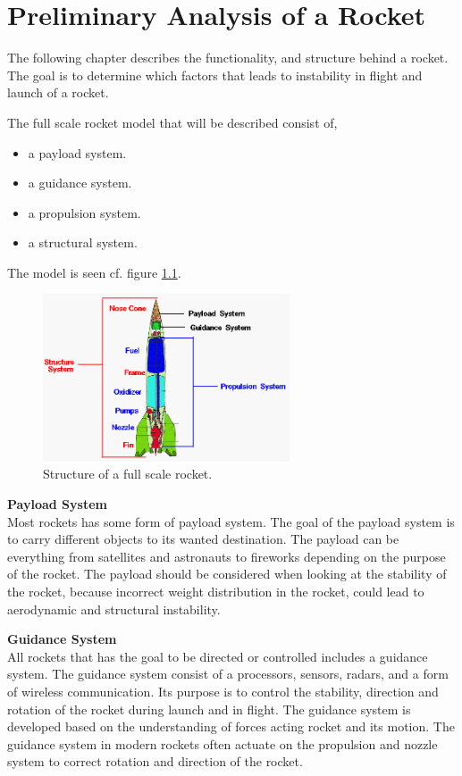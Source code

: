 \chapter{Preliminary Analysis of a Rocket}
The following chapter describes the functionality,  and structure behind a rocket. The goal is to determine which factors that leads to instability in flight and launch of a rocket. 



The full scale rocket model that will be described consist of,
\begin{itemize}[noitemsep]
\item a payload system.
\item a guidance system.
\item a propulsion system. 
\item a structural system.
\end{itemize}    
The model is seen cf. figure \ref{fig:RocketStructure}.
\begin{figure}[htbp]
	\centering
 	\includegraphics[width=0.65\textwidth]{figures/RocketStructure.png} 
 	\caption{Structure of a full scale rocket\cite{web:RocketStructure}.}
 	\label{fig:RocketStructure}
\end{figure}

\textbf{Payload System}\\
Most rockets has some form of payload system. The goal of the payload system is to carry different objects to its wanted destination. The payload can be everything from satellites and astronauts to fireworks depending on the purpose of the rocket. The payload should be considered when looking at the stability of the rocket, because incorrect weight distribution in the rocket, could lead to aerodynamic and structural instability. 


\textbf{Guidance System}\\
All rockets that has the goal to be directed or controlled includes a guidance system. The guidance system consist of a processors, sensors, radars, and  a form of wireless communication. Its purpose is to control the stability, direction and rotation of the rocket during launch and in flight. The guidance system is developed based on the understanding of forces acting rocket and its motion. The guidance system in modern rockets often actuate on the propulsion and nozzle system to correct rotation and direction of the rocket.

